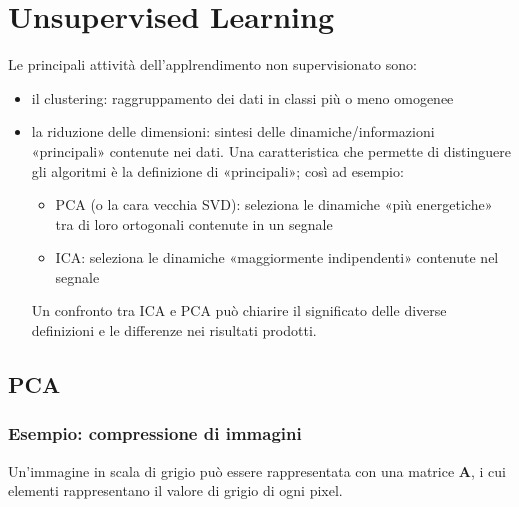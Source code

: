 \documentclass[letterpaper,10pt,italian]{jupyterBook}
\begin{document}
\chapter{Unsupervised Learning}
\label{\detokenize{ch/ai/ul:unsupervised-learning}}\label{\detokenize{ch/ai/ul:ai-ul}}\label{\detokenize{ch/ai/ul::doc}}
\sphinxAtStartPar
Le principali attività dell’applrendimento non supervisionato sono:
\begin{itemize}
\item {} 
\sphinxAtStartPar
il clustering: raggruppamento dei dati in classi più o meno omogenee

\item {} 
\sphinxAtStartPar
la riduzione delle dimensioni: sintesi delle dinamiche/informazioni «principali» contenute nei dati. Una caratteristica che permette di distinguere gli algoritmi è la definizione di «principali»; così ad esempio:
\begin{itemize}
\item {} 
\sphinxAtStartPar
PCA (o la cara vecchia SVD): seleziona le dinamiche «più energetiche» tra di loro ortogonali contenute in un segnale

\item {} 
\sphinxAtStartPar
ICA: seleziona le dinamiche «maggiormente indipendenti» contenute nel segnale

\end{itemize}

\sphinxAtStartPar
Un confronto tra ICA e PCA può chiarire il significato delle diverse definizioni e le differenze nei risultati prodotti.

\end{itemize}

\sphinxstepscope


\section{PCA}
\label{\detokenize{ch/ai/pca:pca}}\label{\detokenize{ch/ai/pca:ia-ul-pca}}\label{\detokenize{ch/ai/pca::doc}}

\subsection{Esempio: compressione di immagini}
\label{\detokenize{ch/ai/pca:esempio-compressione-di-immagini}}
\sphinxAtStartPar
Un’immagine in scala di grigio può essere rappresentata con una matrice \(\mathbf{A}\), i cui elementi rappresentano il valore di grigio di ogni pixel.
\end{document}
